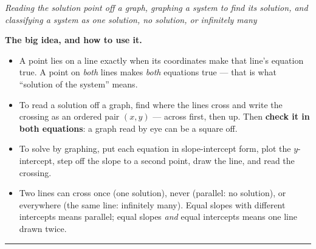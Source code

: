 \documentclass[12pt]{article}
\begin{document}

\begin{center}\small\textit{Reading the solution point off a graph, graphing a
system to find its solution, and classifying a system as one solution, no
solution, or infinitely many}\end{center}

\noindent\textbf{The big idea, and how to use it.}
\begin{itemize}[leftmargin=0.9cm, itemsep=1pt, topsep=2pt]
  \item A point lies on a line exactly when its coordinates make that line's
        equation true. A point on \emph{both} lines makes \emph{both} equations
        true --- that is what ``solution of the system'' means.
  \item To read a solution off a graph, find where the lines cross and write the
        crossing as an ordered pair $(x, y)$ --- across first, then up. Then
        \textbf{check it in both equations}: a graph read by eye can be a square off.
  \item To solve by graphing, put each equation in slope-intercept form, plot the
        $y$-intercept, step off the slope to a second point, draw the line, and read
        the crossing.
  \item Two lines can cross once (one solution), never (parallel: no solution), or
        everywhere (the same line: infinitely many). Equal slopes with different
        intercepts means parallel; equal slopes \emph{and} equal intercepts means one
        line drawn twice.
\end{itemize}
\vspace{0.1cm}
\noindent\rule{\linewidth}{0.4pt}

\end{document}
